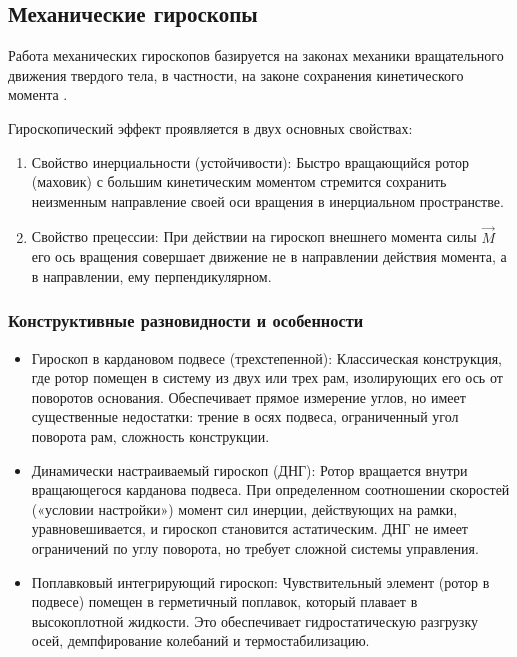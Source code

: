 \subsection{Механические гироскопы}

Работа механических гироскопов базируется на законах механики вращательного движения твердого тела, в частности, на законе сохранения кинетического момента \cite{babaeva1973giroskopy}.

Гироскопический эффект проявляется в двух основных свойствах:

\begin{enumerate}
	\item Свойство инерциальности (устойчивости): Быстро вращающийся ротор (маховик) с большим кинетическим моментом стремится сохранить неизменным направление своей оси вращения в инерциальном пространстве.
	\item Свойство прецессии: При действии на гироскоп внешнего момента силы $\vec{M}$ его ось вращения совершает движение не в направлении действия момента, а в направлении, ему перпендикулярном. 
\end{enumerate}



\subsubsection{Конструктивные разновидности и особенности}

\begin{itemize}
	\item Гироскоп в кардановом подвесе (трехстепенной): Классическая конструкция, где ротор помещен в систему из двух или трех рам, изолирующих его ось от поворотов основания. Обеспечивает прямое измерение углов, но имеет существенные недостатки: трение в осях подвеса, ограниченный угол поворота рам, сложность конструкции.
	
	\item Динамически настраиваемый гироскоп (ДНГ): Ротор вращается внутри вращающегося карданова подвеса. При определенном соотношении скоростей («условии настройки») момент сил инерции, действующих на рамки, уравновешивается, и гироскоп становится астатическим. ДНГ не имеет ограничений по углу поворота, но требует сложной системы управления.
	
	\item Поплавковый интегрирующий гироскоп: Чувствительный элемент (ротор в подвесе) помещен в герметичный поплавок, который плавает в высокоплотной жидкости. Это обеспечивает гидростатическую разгрузку осей, демпфирование колебаний и термостабилизацию.
\end{itemize}

